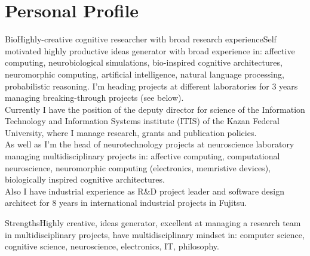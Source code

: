 \documentclass{moderncv}
\begin{document}

\makecvtitle

 
\section{Personal Profile}

\cventry
    {Bio}{Highly-creative cognitive researcher with broad research experience}{}{}{}{Self motivated highly productive ideas generator with broad experience in: affective computing, neurobiological simulations, bio-inspired cognitive architectures, neuromorphic computing, artificial intelligence, natural language processing, probabilistic reasoning. I'm heading projects at different laboratories for 3 years managing breaking-through projects (see below).\\
      Currently I have the position of the deputy director for science of the Information Technology and Information Systems institute (ITIS) of the Kazan Federal University, where I manage research, grants and publication policies.\\
      As well as I'm the head of neurotechnology projects at neuroscience laboratory managing multidisciplinary projects in: affective computing, computational neuroscience, neuromorphic computing (electronics, memristive devices), biologically inspired cognitive architectures.\\
      Also I have industrial experience as R\&D project leader and software design architect for 8 years in international industrial projects in Fujitsu.}

\cvitem
    {Strengths}{\small Highly creative, ideas generator, excellent at managing a research team in multidisciplinary projects, have multidisciplinary mindset in: computer science, cognitive science, neuroscience, electronics, IT, philosophy.}
\end{document}
